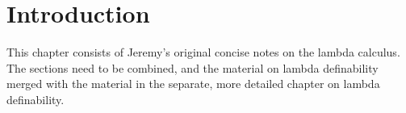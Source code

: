 \documentclass[../../../include/open-logic-chapter]{subfiles}
\begin{document}
\chapter{Introduction}

\begin{editorial}
This chapter consists of Jeremy's original concise notes on the lambda
calculus. The sections need to be combined, and the material on lambda
definability merged with the material in the separate, more detailed
chapter on lambda definability.
\end{editorial}













\OLEndChapterHook
\end{document}
